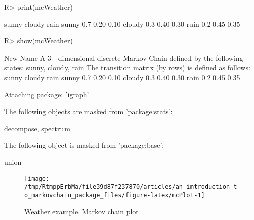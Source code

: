 \documentclass[
  nojss]{jss}
\begin{document}
\begin{CodeChunk}

\begin{CodeInput}
R> print(mcWeather)
\end{CodeInput}

\begin{CodeOutput}
       sunny cloudy rain
sunny    0.7   0.20 0.10
cloudy   0.3   0.40 0.30
rain     0.2   0.45 0.35
\end{CodeOutput}

\begin{CodeInput}
R> show(mcWeather)
\end{CodeInput}

\begin{CodeOutput}
New Name 
 A  3 - dimensional discrete Markov Chain defined by the following states: 
 sunny, cloudy, rain 
 The transition matrix  (by rows)  is defined as follows: 
       sunny cloudy rain
sunny    0.7   0.20 0.10
cloudy   0.3   0.40 0.30
rain     0.2   0.45 0.35
\end{CodeOutput}
\end{CodeChunk}

\begin{CodeChunk}

\begin{CodeOutput}

Attaching package: 'igraph'
\end{CodeOutput}

\begin{CodeOutput}
The following objects are masked from 'package:stats':

    decompose, spectrum
\end{CodeOutput}

\begin{CodeOutput}
The following object is masked from 'package:base':

    union
\end{CodeOutput}
\begin{figure}

{\centering \texttt{[image: /tmp/RtmppErbMa/file39d87f237870/articles/an\_introduction\_to\_markovchain\_package\_files/figure-latex/mcPlot-1]} 

}

\caption[Weather example]{Weather example. Markov chain plot}\label{fig:mcPlot}
\end{figure}
\end{CodeChunk}
\end{document}
